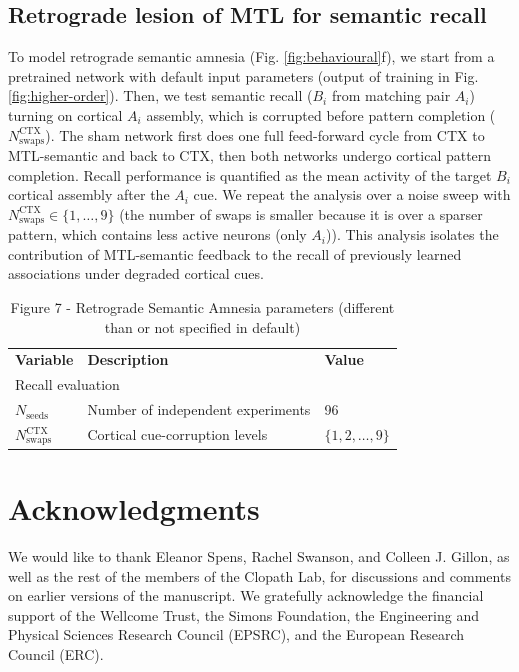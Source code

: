 \documentclass{article}
\begin{document}
\subsection*{Retrograde lesion of MTL for semantic recall}
To model retrograde semantic amnesia (Fig. \ref{fig:behavioural}f), we start from a pretrained network with default input parameters (output of training in Fig. \ref{fig:higher-order}).
\newline\newline
Then, we test semantic recall ($B_i$ from matching pair $A_i$) turning on cortical $A_i$ assembly, which is corrupted before pattern completion ($N_\mathrm{swaps}^{\mathrm{CTX}}$). The sham network first does one full feed-forward cycle from CTX to MTL-semantic and back to CTX, then both networks undergo cortical pattern completion. Recall performance is quantified as the mean activity of the target $B_i$ cortical assembly after the $A_i$ cue.
\newline\newline
We repeat the analysis over a noise sweep with $N_\mathrm{swaps}^{\mathrm{CTX}}\in\{1,\dots,9\}$ (the number of swaps is smaller because it is over a sparser pattern, which contains less active neurons (only $A_i$)). This analysis isolates the contribution of MTL-semantic feedback to the recall of previously learned associations under degraded cortical cues.
\begin{table}[h!]
\centering
\caption{Figure 7 - Retrograde Semantic Amnesia parameters (different than or not specified in default)}
\label{tab:retrograde_amnesia}
\begin{tabular}{lll}
\toprule
\textbf{Variable} & \textbf{Description} & \textbf{Value} \\
\multicolumn{3}{l}{Recall evaluation} \\
$N_{\textrm{seeds}}$ & Number of independent experiments & 96 \\
$N_{\textrm{swaps}}^{\textrm{CTX}}$ & Cortical cue-corruption levels & $\{1,2,\ldots, 9\}$ \\
\bottomrule
\end{tabular}
\end{table}
\clearpage
\section*{Acknowledgments}
We would like to thank Eleanor Spens, Rachel Swanson, and Colleen J. Gillon, as well as the rest of the members of the Clopath Lab, for discussions and  comments on earlier versions of the manuscript. We gratefully acknowledge the financial support of the Wellcome Trust, the Simons Foundation, the Engineering and Physical Sciences Research Council (EPSRC), and the European Research Council (ERC).
\end{document}

